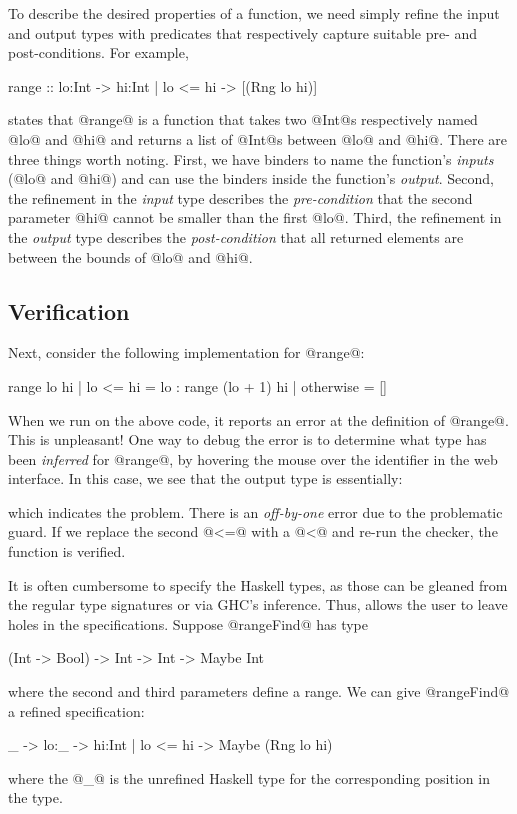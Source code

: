 To describe the desired properties of a function, we need
simply refine the input and output types with predicates 
that respectively capture suitable pre- and post-conditions. 
For example,
%
\begin{code}
  range :: lo:Int -> hi:{Int | lo <= hi} 
        -> [(Rng lo hi)]
\end{code}
%
states that @range@ is a function that takes two @Int@s 
respectively named @lo@ and @hi@ and returns a list of @Int@s 
between @lo@ and @hi@. There are three things worth
noting.
%
First, we have binders to name the function's \emph{inputs} 
(\eg @lo@ and @hi@) and can use the binders inside the 
function's \emph{output}.
%
Second, the refinement in the \emph{input} type describes the 
\emph{pre-condition} that the second parameter @hi@ cannot 
be smaller than the first @lo@.
%
Third, the refinement in the \emph{output} type describes the
\emph{post-condition} that all returned elements are between 
the bounds of @lo@ and @hi@.


\subsection{Verification}\label{sec:tool:verification}

Next, consider the following implementation for @range@:
%
\begin{code}
  range lo hi 
    | lo <= hi  = lo : range (lo + 1) hi
    | otherwise = []
\end{code}
%
When we run \toolname on the above code, it reports an 
error at the definition of @range@. This is unpleasant! 
One way to debug the error is to determine what type has
been \emph{inferred} for @range@, \eg by hovering the 
mouse over the identifier in the web interface. 
In this case, we see that the output type is essentially:
%
\begin{code}
  [{v:Int | lo <= v && v <= hi}]
\end{code}
%
which indicates the problem. There is an \emph{off-by-one} 
error due to the problematic guard. If we replace the second @<=@ 
with a @<@ and re-run the checker, the function is verified.

 It is often cumbersome to specify the Haskell
types, as those can be gleaned from the regular type signatures 
or via GHC's inference. Thus, \toolname allows the user to leave 
holes in the specifications. Suppose @rangeFind@ has type 
%
\begin{code}
  (Int -> Bool) -> Int -> Int -> Maybe Int
\end{code}
%
where the second and third parameters define a range. 
We can give @rangeFind@ a refined specification:
%
\begin{code}
  _ -> lo:_ -> hi:{Int | lo <= hi} -> Maybe (Rng lo hi)
\end{code}
%
where the @_@ is the unrefined Haskell type for the 
corresponding position in the type.

